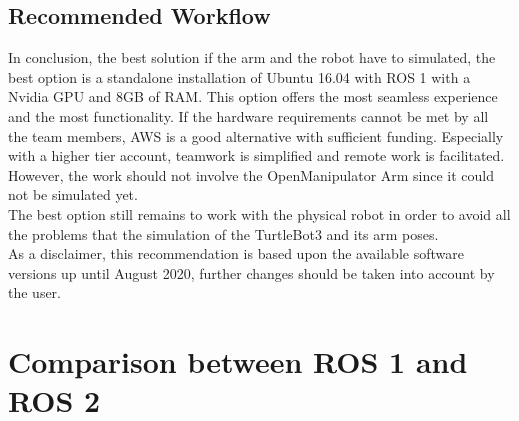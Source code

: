 \documentclass[plainarticle,zihtitle,english,final,hyperref,utf8]{zihpub}
\begin{document}
\subsection{Recommended Workflow}
\label{recommended_workflow}
In conclusion, the best solution if the arm and the robot have to simulated, the best option is a standalone installation of Ubuntu 16.04 with ROS 1 with a Nvidia GPU and 8GB of RAM. This option offers the most seamless experience and the most functionality. 
If the hardware requirements cannot be met by all the team members, AWS is a good alternative with sufficient funding. Especially with a higher tier account, teamwork is simplified and remote work is facilitated. However, the work should not involve the OpenManipulator Arm since it could not be simulated yet.\\
\newline
The best option still remains to work with the physical robot in order to avoid all the problems that the simulation of the TurtleBot3 and its arm poses.\\
\newline
As a disclaimer, this recommendation is based upon the available software versions up until August 2020, further changes should be taken into account by the user.



\section{Comparison between ROS 1 and ROS 2}
\end{document}
